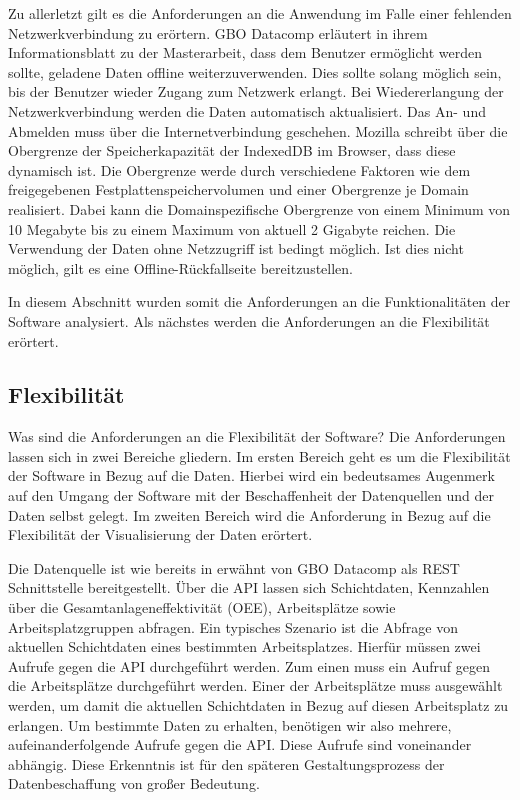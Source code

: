 Zu allerletzt gilt es die Anforderungen an die Anwendung im Falle einer fehlenden Netzwerkverbindung
zu erörtern. GBO Datacomp erläutert in ihrem Informationsblatt zu der Masterarbeit, dass dem Benutzer
ermöglicht werden sollte, geladene Daten offline weiterzuverwenden. Dies sollte solang möglich sein,
bis der Benutzer wieder Zugang zum Netzwerk erlangt. Bei Wiedererlangung der Netzwerkverbindung werden
die Daten automatisch aktualisiert. Das An- und Abmelden muss über die Internetverbindung
geschehen. Mozilla schreibt über die Obergrenze der Speicherkapazität der IndexedDB im Browser,
dass diese dynamisch ist. Die Obergrenze werde durch verschiedene Faktoren wie dem freigegebenen
Festplattenspeichervolumen und einer Obergrenze je Domain realisiert. Dabei kann die Domainspezifische
Obergrenze von einem Minimum von 10 Megabyte bis zu einem Maximum von aktuell 2 Gigabyte reichen.\cite{MozillaStorageLimit}
Die Verwendung der Daten ohne Netzzugriff ist bedingt möglich. Ist dies nicht möglich, gilt es
eine Offline-Rückfallseite bereitzustellen.

In diesem Abschnitt wurden somit die Anforderungen an die Funktionalitäten der Software analysiert. Als
nächstes werden die Anforderungen an die Flexibilität erörtert.

\subsection{Flexibilität}
\label{subsec:flexibilitaet}
Was sind die Anforderungen an die Flexibilität der Software? Die Anforderungen lassen sich in zwei
Bereiche gliedern. Im ersten Bereich geht es um die Flexibilität der Software in Bezug auf die Daten. Hierbei wird ein bedeutsames
Augenmerk auf den Umgang der Software mit der Beschaffenheit der Datenquellen und der Daten selbst gelegt. Im zweiten Bereich
wird die Anforderung in Bezug auf die Flexibilität der Visualisierung der Daten erörtert.

Die Datenquelle ist wie bereits in  erwähnt von GBO Datacomp als REST Schnittstelle
bereitgestellt. Über die API lassen sich Schichtdaten, Kennzahlen über die Gesamtanlageneffektivität (OEE), Arbeitsplätze
sowie Arbeitsplatzgruppen abfragen. Ein typisches Szenario ist die Abfrage von aktuellen Schichtdaten eines bestimmten
Arbeitsplatzes. Hierfür müssen zwei Aufrufe gegen die API durchgeführt werden. Zum einen muss ein Aufruf gegen die
Arbeitsplätze durchgeführt werden. Einer der Arbeitsplätze muss ausgewählt werden, um damit die aktuellen Schichtdaten
in Bezug auf diesen Arbeitsplatz zu erlangen. Um bestimmte Daten zu erhalten, benötigen wir also mehrere, aufeinanderfolgende
Aufrufe gegen die API. Diese Aufrufe sind voneinander abhängig. Diese Erkenntnis ist für den späteren Gestaltungsprozess
der Datenbeschaffung von großer Bedeutung.

